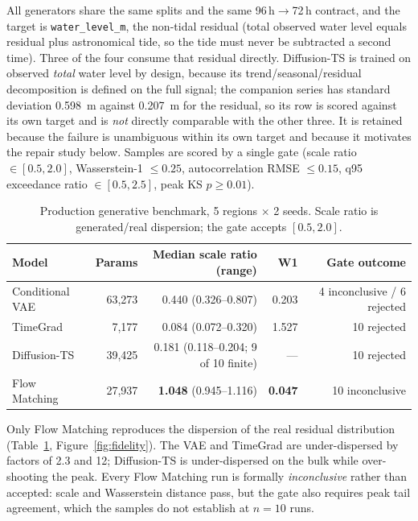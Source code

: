 All generators share the same splits and the same
96\,h$\rightarrow$72\,h contract, and the target is
\texttt{water\_level\_m}, the non-tidal residual (total observed water level
equals residual plus astronomical tide, so the tide must never be subtracted a
second time). Three of the four consume that residual directly. Diffusion-TS is
trained on observed \emph{total} water level by design, because its
trend/seasonal/residual decomposition is defined on the full signal; the
companion series has standard deviation 0.598~m against 0.207~m for the residual,
so its row is scored against its own target and is \emph{not} directly
comparable with the other three. It is retained because the failure is
unambiguous within its own target and because it motivates the repair study
below. Samples are scored by a single
gate (scale ratio $\in[0.5, 2.0]$, Wasserstein-1 $\le 0.25$, autocorrelation RMSE
$\le 0.15$, q95 exceedance ratio $\in[0.5, 2.5]$, peak KS $p \ge 0.01$).

\begin{table}[htbp]
\centering
\caption{Production generative benchmark, 5 regions $\times$ 2 seeds.
Scale ratio is generated/real dispersion; the gate accepts $[0.5, 2.0]$.}
\begin{tabular}{l r r r r}
\toprule
Model & Params & Median scale ratio (range) & W1 & Gate outcome \\
\midrule
Conditional VAE & 63{,}273 & 0.440 (0.326--0.807) & 0.203 & 4 inconclusive / 6 rejected \\
TimeGrad        & 7{,}177  & 0.084 (0.072--0.320) & 1.527 & 10 rejected \\
Diffusion-TS    & 39{,}425 & 0.181 (0.118--0.204; 9 of 10 finite) & ---   & 10 rejected \\
Flow Matching   & 27{,}937 & \textbf{1.048} (0.945--1.116) & \textbf{0.047} & 10 inconclusive \\
\bottomrule
\end{tabular}
\label{tab:generators}
\end{table}

Only Flow Matching reproduces the dispersion of the real residual
distribution (Table~\ref{tab:generators}, Figure~\ref{fig:fidelity}). The VAE
and TimeGrad are under-dispersed by factors of 2.3 and 12; Diffusion-TS is
under-dispersed on the bulk while over-shooting the peak. Every Flow Matching
run is formally \emph{inconclusive} rather than accepted: scale and
Wasserstein distance pass, but the gate also requires peak tail agreement, which
the samples do not establish at $n=10$ runs.

